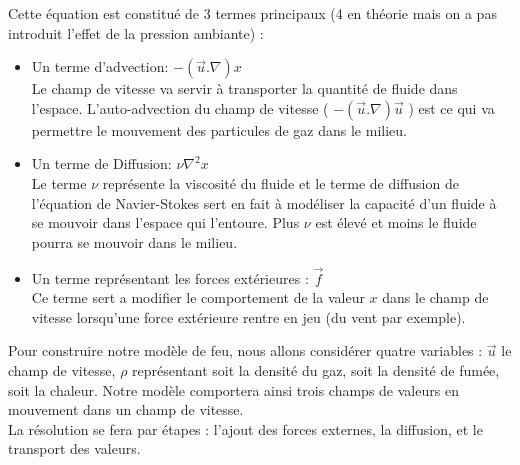 \documentclass[a4paper,10pt]{article}
\begin{document}
Cette équation est constitué de 3 termes principaux (4 en théorie mais
on a pas introduit l'effet de la pression ambiante) :\\
\begin{itemize}
\item{Un terme d'advection: $-(\vec{u}.\nabla)x$}\\ Le champ de
  vitesse va servir à transporter la quantité de fluide dans
  l'espace. L'auto-advection du champ de vitesse (
  $-(\vec{u}.\nabla)\vec{u}$ ) est ce qui va permettre le mouvement
  des particules de gaz dans le milieu.\\
\item{Un terme de Diffusion: $\nu{\nabla^2}x$}\\ Le terme $\nu$
  représente la viscosité du fluide et le terme de diffusion de
  l'équation de Navier-Stokes sert en fait à modéliser la capacité
  d'un fluide à se mouvoir dans l'espace qui l'entoure. Plus $\nu$ est
  élevé et moins le fluide pourra se mouvoir dans le milieu.\\
\item{Un terme représentant les forces extérieures : $\vec{f}$}\\ Ce
  terme sert a modifier le comportement de la valeur $x$ dans le champ
  de vitesse lorsqu'une force extérieure rentre en jeu (du vent par
  exemple).\\
\end{itemize}

Pour construire notre modèle de feu, nous allons considérer quatre
variables : $\vec{u}$ le champ de vitesse, $\rho$ représentant soit la densité du
gaz, soit la densité de fumée, soit la chaleur. Notre modèle comportera ainsi trois champs de valeurs en mouvement dans un
champ de vitesse.\\ 

La résolution se fera par étapes : l'ajout des forces externes, la
diffusion, et le transport des valeurs.\\
\end{document}
